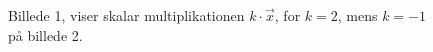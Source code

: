 
\begin{figure}[h]
\begin{center}

\caption{Billede 1, viser skalar multiplikationen $k \cdot \vec{x}$, for $k=2$, mens $k=-1$ på billede 2.}
\end{center}
\label{fig:vektorskalar}
\end{figure}



